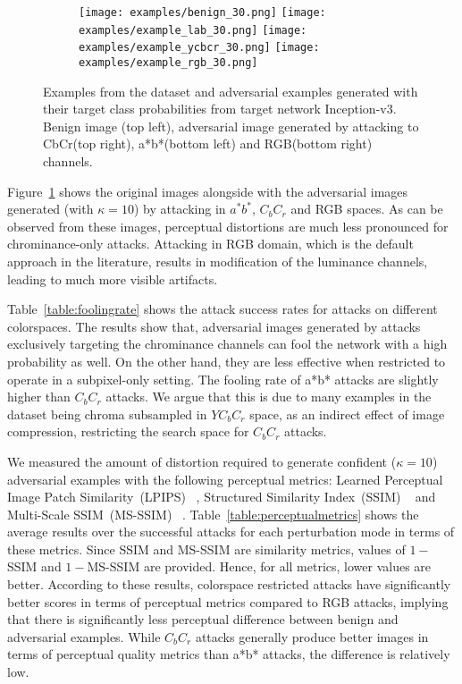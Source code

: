 \begin{figure}[ht]
    \ContinuedFloat
    \begin{subfigure}[b]{\linewidth}
        \caption{}
        \texttt{[image: examples/benign\_30.png]}
        \texttt{[image: examples/example\_lab\_30.png]}
        \texttt{[image: examples/example\_ycbcr\_30.png]}
        \texttt{[image: examples/example\_rgb\_30.png]}
    \end{subfigure}


    \caption[Examples from the dataset and adversarial examples generated with their target class probabilities from target network Inception-v3.]{Examples from the dataset and adversarial examples generated with their target class probabilities from target network Inception-v3. Benign image (top left), adversarial image generated by attacking to CbCr(top right), a*b*(bottom left) and RGB(bottom right) channels. }\label{fig:visualprob}
\end{figure}

Figure~\ref{fig:visualprob} shows the original images alongside with the adversarial images generated (with \(\kappa = 10\)) by attacking in \(a^*b^*\), \(C_{b}C_{r}\) and RGB spaces. As can be observed from these images, perceptual distortions are much less pronounced for chrominance-only attacks. Attacking in RGB domain, which is the default approach in the literature, results in modification of the luminance channels, leading to much more visible artifacts.

Table~\ref*{table:foolingrate} shows the attack success rates for attacks on different colorspaces. The results show that, adversarial images generated by attacks exclusively targeting the chrominance channels can fool the network with a high probability as well. On the other hand, they are less effective when restricted to operate in a subpixel-only setting. The fooling rate of a*b* attacks are slightly higher than \(C_bC_r\) attacks. We argue that this is due to many examples in the dataset being chroma subsampled in \(YC_bC_r\) space, as an indirect effect of image compression, restricting the search space for \(C_bC_r\) attacks.

We measured the amount of distortion required to generate confident (\(\kappa = 10\)) adversarial examples with the following perceptual metrics: Learned Perceptual Image Patch Similarity~(LPIPS) ~\cite{zhang2018unreasonable}, Structured Similarity Index~(SSIM) ~\cite{wang2004image} and Multi-Scale SSIM~(MS-SSIM) ~\cite{wang2003multiscale}. Table~\ref{table:perceptualmetrics} shows the average results over the successful attacks for each perturbation mode in terms of these metrics. Since SSIM and MS-SSIM are similarity metrics, values of \(1-\)SSIM and \(1-\)MS-SSIM are provided. Hence, for all metrics, lower values are better. According to these results, colorspace restricted attacks have significantly better scores in terms of perceptual metrics compared to RGB attacks, implying that there is significantly less perceptual difference between benign and adversarial examples. While \(C_bC_r\) attacks generally produce better images in terms of perceptual quality metrics than a*b* attacks, the difference is relatively low.
